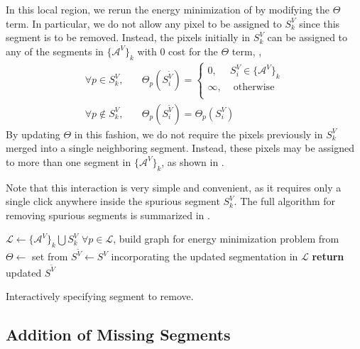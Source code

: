 \documentclass[]{spie}  %
\begin{document}
In this local region, we rerun the energy minimization of 
by modifying the $\Theta$ term.  In particular, we do not allow any
pixel to be assigned to $S^V_k$ since this segment is to be removed.
Instead, the pixels initially in $S^V_k$ can be assigned to any of the
segments in $\{\mathcal{A}^V\}_k$ with $0$ cost for the $\Theta$ term,
\ie,
\begin{equation}\label{eq:remove}
\begin{aligned}
 \forall p \in S^V_k ,& \quad \Theta_p(S^{\tilde{V}}_i) = \left\{
   \begin{array}{lcr}
     0, & S^V_i \in \{\mathcal{A}^V\}_k  \\
     \infty, & \textrm{ otherwise} \\
   \end{array}
 \right. \\
\forall p \notin S^V_k ,& \quad \Theta_p(S^{\tilde{V}}_i) = \Theta_p(S^V_i)
\end{aligned}
\end{equation}
By updating $\Theta$ in this fashion, we do not require the pixels
previously in $S^V_k$ merged into a single neighboring segment.
Instead, these pixels may be assigned to more than one segment in
$\{\mathcal{A}^V\}_k$, as shown in .

Note that this interaction is very simple and convenient, as it
requires only a single click anywhere inside the spurious segment
$S^V_k$.  The full algorithm for removing spurious segments is
summarized in .

\begin{algorithm}[!t]
  \centering
  \algrenewcommand{}
  \begin{algorithmic}[1]
    \State $\mathcal{L} \gets \{\mathcal{A}^V\}_k \bigcup S^V_k$
    \State $\forall p \in \mathcal{L}$, build graph for energy minimization problem from~\cite{waggoner:11}
    \State $\Theta \gets $ set from 
    \State $S^{\tilde{V}} \gets S^V$ incorporating the updated segmentation in $\mathcal{L}$
    \State \textbf{return} updated $S^{\tilde{V}}$
    \EndFunction
  \end{algorithmic}
  \caption{Interactively specifying segment to remove.}
  \label{alg:remove}
\end{algorithm}

\subsection{Addition of Missing Segments}
\label{sec:addition}
\end{document}
